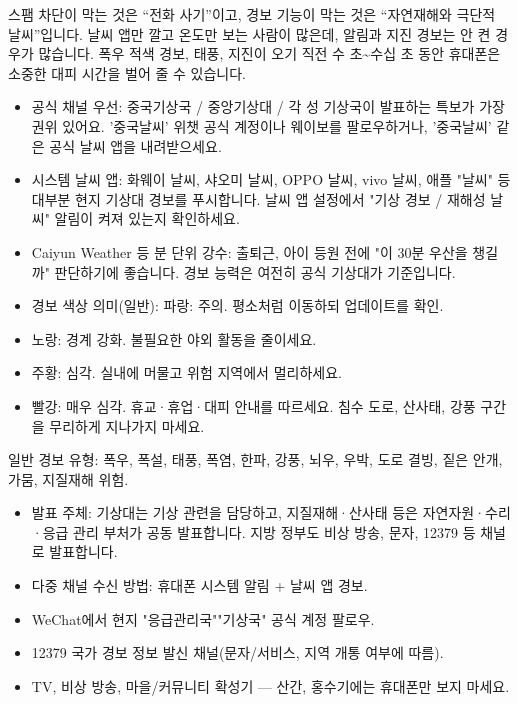 
스팸 차단이 막는 것은 “전화 사기”이고, 경보 기능이 막는 것은 “자연재해와 극단적 날씨”입니다. 날씨 앱만 깔고 온도만 보는 사람이 많은데, 알림과 지진 경보는 안 켠 경우가 많습니다. 폭우 적색 경보, 태풍, 지진이 오기 직전 수 초\textasciitilde{}수십 초 동안 휴대폰은 소중한 대피 시간을 벌어 줄 수 있습니다.


\begin{itemize}
  \item 공식 채널 우선: 중국기상국 / 중앙기상대 / 각 성 기상국이 발표하는 특보가 가장 권위 있어요. '중국날씨' 위챗 공식 계정이나 웨이보를 팔로우하거나, '중국날씨' 같은 공식 날씨 앱을 내려받으세요.
  \item 시스템 날씨 앱: 화웨이 날씨, 샤오미 날씨, OPPO 날씨, vivo 날씨, 애플 "날씨" 등 대부분 현지 기상대 경보를 푸시합니다. 날씨 앱 설정에서 "기상 경보 / 재해성 날씨" 알림이 켜져 있는지 확인하세요.
  \item Caiyun Weather 등 분 단위 강수: 출퇴근, 아이 등원 전에 "이 30분 우산을 챙길까" 판단하기에 좋습니다. 경보 능력은 여전히 공식 기상대가 기준입니다.
  \item 경보 색상 의미(일반): 파랑: 주의. 평소처럼 이동하되 업데이트를 확인.
  \item 노랑: 경계 강화. 불필요한 야외 활동을 줄이세요.
  \item 주황: 심각. 실내에 머물고 위험 지역에서 멀리하세요.
  \item 빨강: 매우 심각. 휴교·휴업·대피 안내를 따르세요. 침수 도로, 산사태, 강풍 구간을 무리하게 지나가지 마세요.
\end{itemize}

일반 경보 유형: 폭우, 폭설, 태풍, 폭염, 한파, 강풍, 뇌우, 우박, 도로 결빙, 짙은 안개, 가뭄, 지질재해 위험.


\begin{itemize}
  \item 발표 주체: 기상대는 기상 관련을 담당하고, 지질재해·산사태 등은 자연자원·수리·응급 관리 부처가 공동 발표합니다. 지방 정부도 비상 방송, 문자, 12379 등 채널로 발표합니다.
  \item 다중 채널 수신 방법: 휴대폰 시스템 알림 + 날씨 앱 경보.
  \item WeChat에서 현지 "응급관리국""기상국" 공식 계정 팔로우.
  \item 12379 국가 경보 정보 발신 채널(문자/서비스, 지역 개통 여부에 따름).
  \item TV, 비상 방송, 마을/커뮤니티 확성기 — 산간, 홍수기에는 휴대폰만 보지 마세요.
\end{itemize}


